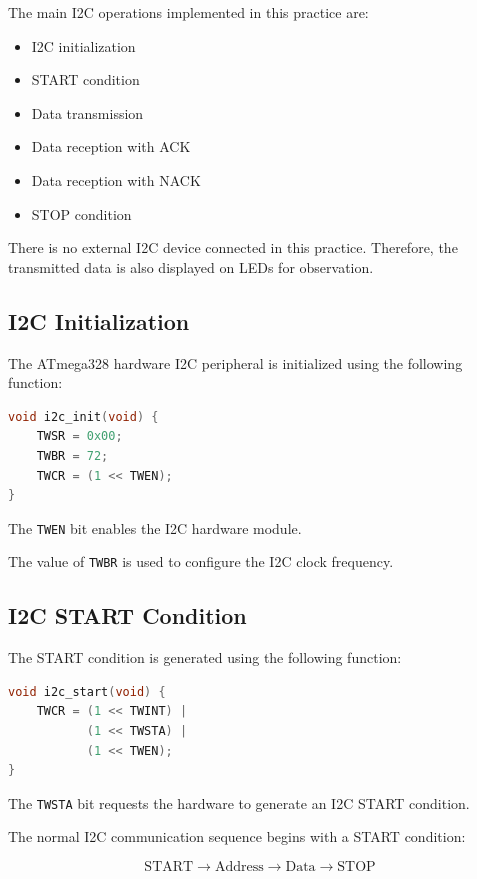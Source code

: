 \documentclass[12pt,a4paper]{article}
\begin{document}
The main I2C operations implemented in this practice are:

\begin{itemize}
    \item I2C initialization
    \item START condition
    \item Data transmission
    \item Data reception with ACK
    \item Data reception with NACK
    \item STOP condition
\end{itemize}

There is no external I2C device connected in this practice. Therefore,
the transmitted data is also displayed on LEDs for observation.

\subsection{I2C Initialization}

The ATmega328 hardware I2C peripheral is initialized using the
following function:

\begin{lstlisting}[language=C]
void i2c_init(void) {
    TWSR = 0x00;
    TWBR = 72;
    TWCR = (1 << TWEN);
}
\end{lstlisting}

The \texttt{TWEN} bit enables the I2C hardware module.

The value of \texttt{TWBR} is used to configure the I2C clock
frequency.

\subsection{I2C START Condition}

The START condition is generated using the following function:

\begin{lstlisting}[language=C]
void i2c_start(void) {
    TWCR = (1 << TWINT) |
           (1 << TWSTA) |
           (1 << TWEN);
}
\end{lstlisting}

The \texttt{TWSTA} bit requests the hardware to generate an I2C START
condition.

The normal I2C communication sequence begins with a START condition:

\[
\text{START}
\rightarrow
\text{Address}
\rightarrow
\text{Data}
\rightarrow
\text{STOP}
\]
\end{document}
